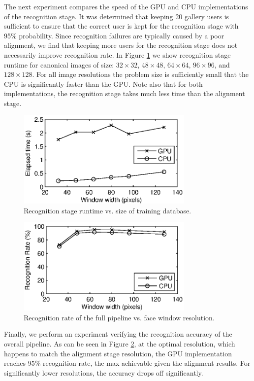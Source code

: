 \documentclass[10pt,twocolumn,letterpaper]{article}
\begin{document}
The next experiment compares the speed of the GPU and CPU implementations of
the recognition stage.  It was determined that keeping 20 gallery users is
sufficient to ensure that the correct user is kept for the recognition stage
with 95\% probability.  Since recognition failures are typically caused by a
poor alignment, we find that keeping more users for the recognition stage does
not necessarily improve recognition rate.
In Figure \ref{fig:recognition_stage_runtime} we show recognition stage runtime
for canonical images of size: $32\times32$, $48 \times 48$, $64 \times 64$, $96 \times
96$, and $128 \times 128$.  For all image resolutions the problem size
is sufficiently small that the CPU is significantly faster than the GPU.  Note
also that for both implementations, the recognition stage takes much less time
than the alignment stage.
\begin{figure} 
\centering
\includegraphics[width=3.4in]{figures/speedVsResolution}
\caption{Recognition stage runtime vs. size of training database.}
\label{fig:recognition_stage_runtime} \end{figure}

\begin{figure}
\centering
\includegraphics[width=3.4in]{figures/accuracyVsResolution}
\caption{Recognition rate of the full pipeline vs. face window resolution.}
\label{fig:accuracy_vs_resolution}
\end{figure}
Finally, we perform an experiment verifying the recognition accuracy of the
overall pipeline.  As can be seen in Figure \ref{fig:accuracy_vs_resolution},
at the optimal resolution, which happens to match the alignment stage
resolution, the GPU implementation reaches 95\% recognition rate, the max
achievable given the alignment results.  For significantly lower resolutions,
the accuracy drops off significantly.  
\end{document}
